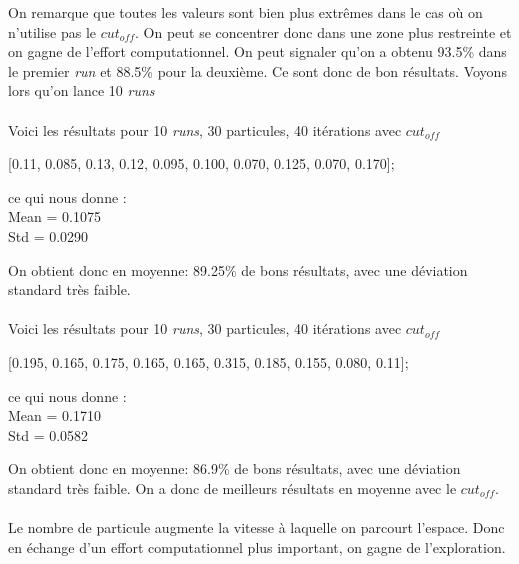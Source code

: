 \documentclass[a4paper, 11pt]{article}
\begin{document}
On remarque que toutes les valeurs sont bien plus extrêmes dans le cas où on n'utilise pas le $cut_{off}$. On peut se concentrer donc 
dans une zone plus restreinte et on gagne de l'effort computationnel. On peut signaler qu'on a obtenu 93.5\% dans le premier \textit{run}
et 88.5\% pour la deuxième. Ce sont donc de bon résultats. Voyons lors qu'on lance 10 \textit{runs}

\paragraph{}
Voici les résultats pour 10 \textit{runs}, 30 particules, 40 itérations avec $cut_{off}$
\begin{center}

[0.11, 0.085, 0.13, 0.12, 0.095, 0.100, 0.070, 0.125, 0.070, 0.170]; 
\end{center}

ce qui nous donne :\\
Mean = 	0.1075\\
Std  = 	0.0290

On obtient donc en moyenne: 89.25\% de bons résultats, avec une déviation standard très faible.

\paragraph{}
Voici les résultats pour 10 \textit{runs}, 30 particules, 40 itérations avec $cut_{off}$
\begin{center}

[0.195, 0.165, 0.175, 0.165, 0.165, 0.315, 0.185, 0.155, 0.080, 0.11];
\end{center}

ce qui nous donne :\\
Mean = 	0.1710\\
Std  = 	0.0582

On obtient donc en moyenne: 86.9\% de bons résultats, avec une déviation standard très faible.
On a donc de meilleurs résultats en moyenne avec le $cut_{off}$.

\paragraph{}
Le nombre de particule augmente la vitesse à laquelle on parcourt l'espace. Donc en échange d'un effort computationnel plus important, on
gagne de l'exploration.
\end{document}

